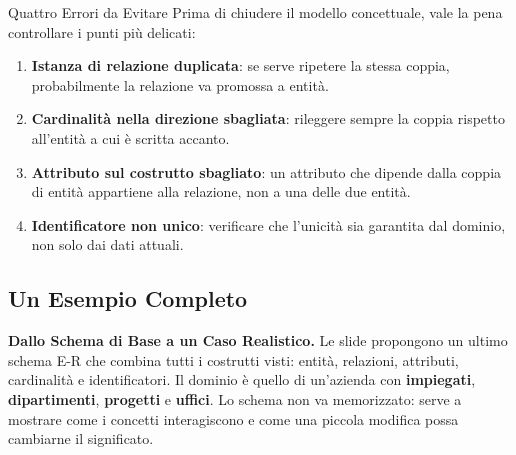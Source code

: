 \documentclass[12pt]{extarticle}
\begin{document}
\begin{cbox}{Quattro Errori da Evitare}
\noindent Prima di chiudere il modello concettuale, vale la pena controllare i punti più delicati:
\begin{enumerate}
    \item \textbf{Istanza di relazione duplicata}: se serve ripetere la stessa coppia, probabilmente la relazione va promossa a entità.
    \item \textbf{Cardinalità nella direzione sbagliata}: rileggere sempre la coppia rispetto all'entità a cui è scritta accanto.
    \item \textbf{Attributo sul costrutto sbagliato}: un attributo che dipende dalla coppia di entità appartiene alla relazione, non a una delle due entità.
    \item \textbf{Identificatore non unico}: verificare che l'unicità sia garantita dal dominio, non solo dai dati attuali.
\end{enumerate}
\end{cbox}

\subsection{Un Esempio Completo}

\noindent \textbf{Dallo Schema di Base a un Caso Realistico.} Le slide propongono un ultimo schema E-R che combina tutti i costrutti visti: entità, relazioni, attributi, cardinalità e identificatori. Il dominio è quello di un'azienda con \textbf{impiegati}, \textbf{dipartimenti}, \textbf{progetti} e \textbf{uffici}. Lo schema non va memorizzato: serve a mostrare come i concetti interagiscono e come una piccola modifica possa cambiarne il significato.
\end{document}
